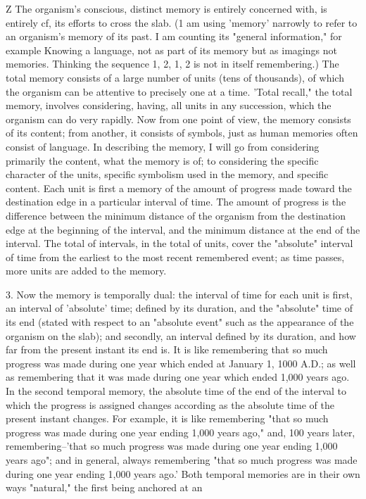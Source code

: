 \documentclass[10pt,twoside]{memoir}
\begin{document}
\begin{enumerate}
{{{{{{{{{{{{{{{Z The organism's conscious, distinct memory is entirely concerned 
with, is entirely cf, its efforts to cross the slab. (1 am using 'memory' 
narrowly to refer to an organism's memory of its past. I am counting its 
"general information," for example Knowing a language, not as part of its 
memory but as imagings not memories. Thinking the sequence 1, 2, 1, 2 is 
not in itself remembering.) The total memory consists of a large number of 
units (tens of thousands), of which the organism can be attentive to precisely 
one at a time. 'Total recall," the total memory, involves considering, having, 
all units in any succession, which the organism can do very rapidly. Now 
from one point of view, the memory consists of its content; from another, it 
consists of symbols, just as human memories often consist of language. In 
describing the memory, I will go from considering primarily the content, 
what the memory is of; to considering the specific character of the units, 
specific symbolism used in the memory, and specific content. Each unit is 
first a memory of the amount of progress made toward the destination edge 
in a particular interval of time. The amount of progress is the difference 
between the minimum distance of the organism from the destination edge at 
the beginning of the interval, and the minimum distance at the end of the 
interval. The total of intervals, in the total of units, cover the "absolute" 
interval of time from the earliest to the most recent remembered event; as 
time passes, more units are added to the memory. 

3. Now the memory is temporally dual: the interval of time for each 
unit is first, an interval of 'absolute' time; defined by its duration, and the 
"absolute" time of its end (stated with respect to an "absolute event" such 
as the appearance of the organism on the slab); and secondly, an interval 
defined by its duration, and how far from the present instant its end is. It is 
like remembering that so much progress was made during one year which 
ended at January 1, 1000 A.D.; as well as remembering that it was made 
during one year which ended 1,000 years ago. In the second temporal 
memory, the absolute time of the end of the interval to which the progress is 
assigned changes according as the absolute time of the present instant 
changes. For example, it is like remembering "that so much progress was 
made during one year ending 1,000 years ago," and, 100 years later, 
remembering--'that so much progress was made during one year ending 
1,000 years ago"; and in general, always remembering "that so much 
progress was made during one year ending 1,000 years ago.' Both temporal 
memories are in their own ways "natural," the first being anchored at an 


}}}}}}}}}}}}}}}
\end{enumerate}
\end{document}
